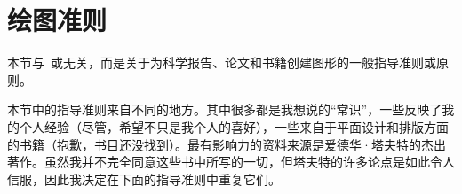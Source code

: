 %
%
%


\section{绘图准则}


本节与\pgfname\ 或\tikzname 无关，而是关于为科学报告、论文和书籍创建图形的一般指导准则或原则。


本节中的指导准则来自不同的地方。其中很多都是我想说的``常识''，一些反映了我的个人经验（尽管，希望不只是我个人的喜好），一些来自于平面设计和排版方面的书籍（抱歉，书目还没找到）。最有影响力的资料来源是爱德华·塔夫特的杰出著作。虽然我并不完全同意这些书中所写的一切，但塔夫特的许多论点是如此令人信服，因此我决定在下面的指导准则中重复它们。


